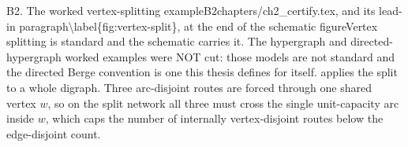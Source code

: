 \begin{offcut}{B2. The worked vertex-splitting example}{B2}{chapters/ch2\_certify.tex,  and its lead-in paragraph}{\textbackslash{}label\{fig:vertex-split\}, at the end of the schematic figure}{Vertex splitting is standard and the schematic  carries it. The hypergraph and directed-hypergraph worked examples were NOT cut: those models are not standard and the directed Berge convention is one this thesis defines for itself.}
 applies the split to a whole digraph. Three arc-disjoint routes are forced through one shared vertex $w$, so on the split network all three must cross the single unit-capacity arc inside $w$, which caps the number of internally vertex-disjoint routes below the edge-disjoint count.


\end{offcut}
